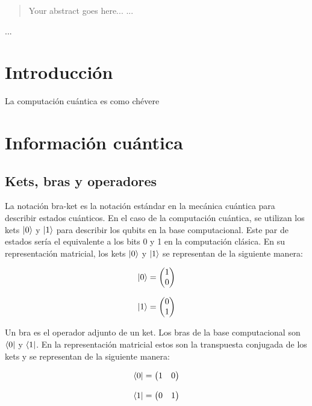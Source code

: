 \documentclass[11pt, spanish]{report}
\begin{document}
\begin{abstract}
Your abstract goes here...
...
\end{abstract}
...

\chapter{Introducción}
La computación cuántica es como chévere

\chapter{Información cuántica}

\section{Kets, bras y operadores}

La notación bra-ket es la notación estándar en la mecánica cuántica para describir estados cuánticos. En el caso de la computación cuántica, se utilizan los kets $\ket{0}$ y $\ket{1}$ para describir los qubits en la base computacional. Este par de estados sería el equivalente a los bits 0 y 1 en la computación clásica. En su representación matricial, los kets $\ket{0}$ y $\ket{1}$ se representan de la siguiente manera:

\[\ket{0} = \begin{pmatrix} 1 \\ 0 \end{pmatrix}\]

\[\ket{1} = \begin{pmatrix} 0 \\ 1 \end{pmatrix}\]

Un bra es el operador adjunto de un ket. Los bras de la base computacional son $\bra{0}$ y $\bra{1}$. En la representación matricial estos son la transpuesta conjugada de los kets y se representan de la siguiente manera:

\[\bra{0} = \begin{pmatrix} 1 & 0 \end{pmatrix}\]

\[\bra{1} = \begin{pmatrix} 0 & 1 \end{pmatrix}\]
\end{document}
